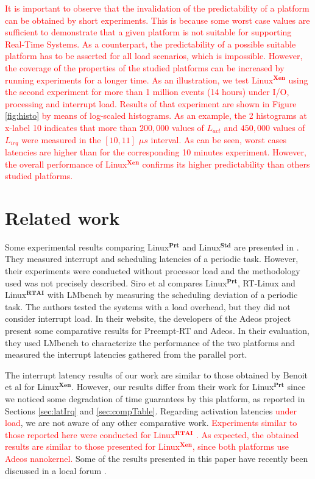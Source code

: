 \documentclass{acm_proc_article-sp}
\newcommand{\col}[1]{\textcolor{red}{#1}}
\newcommand{\preemptt}{{Preempt-RT }}
\begin{document}
\col{It is important to observe that the invalidation of the predictability of a
  platform can be obtained by short experiments. This is because some worst case
  values are sufficient to demonstrate that a given platform is not suitable for
  supporting Real-Time Systems. As a counterpart, the predictability of a possible
  suitable platform has to be asserted for all load scenarios, which is impossible.
  However, the coverage of the properties of the studied platforms can be increased
  by running experiments for a longer time. As an illustration, we test
  Linux$^\mathbf{Xen}$ using the second experiment for more than 1 million events
  (14 hours) under I/O, processing and interrupt load. Results of that experiment
  are shown in Figure \ref{fig:histo} by means of log-scaled histograms. As an
  example, the 2 histograms at x-label 10 indicates that more than $200,000$ values of
  $L_{act}$ and $450,000$ values of $L_{irq}$ were measured in the $[10, 11]$ $\mu s$
  interval. As can be seen, worst cases latencies are higher than for the
  corresponding 10 minutes experiment. However, the overall performance of
  Linux$^\mathbf{Xen}$ confirms its higher predictability than others studied
  platforms. }

\section{Related work}
\label{sec:trabRel}

Some experimental results comparing Linux$^{\mathbf{Prt}}$ and
Linux$^{\mathbf{Std}}$ are presented in \cite{Rostedt07}. They measured interrupt
and scheduling latencies of a periodic task. However, their experiments were
conducted without processor load and the methodology used was not precisely
described. Siro et al \cite{Siro07} compares Linux$^{\mathbf{Prt}}$, RT-Linux
\cite{rtLinux} and Linux$^{\mathbf{RTAI}}$ \cite{RTAI} with LMbench \cite{McVoy96}
by measuring the scheduling deviation of a periodic task. The authors tested the
systems with a load overhead, but they did not consider interrupt load. In their
website, the developers of the Adeos project \cite{Benoit05} present some
comparative results for \preemptt and Adeos. In their evaluation, they used LMbench
\cite{McVoy96} to characterize the performance of the two platforms and measured the
interrupt latencies gathered from the parallel port.

The interrupt latency results of our work are similar to those obtained by Benoit et
al \cite{Benoit05} for Linux$^{\mathbf{Xen}}$. However, our results differ from
their work for Linux$^{\mathbf{Prt}}$ since we noticed some degradation of time
guarantees by this platform, as reported in Sections \ref{sec:latIrq} and
\ref{sec:compTable}.  Regarding activation latencies \col{under load}, we are not
aware of any other comparative work. \col{Experiments similar to those reported here were
conducted for Linux$^{\mathbf{RTAI}}$ \cite{Regnier08b}. As expected, the obtained 
results are similar to those presented for Linux$^{\mathbf{Xen}}$, since both platforms use Adeos
nanokernel. } Some of the results presented in this paper have recently been
discussed in a local forum \cite{Regnier08-wso}.
\end{document}
